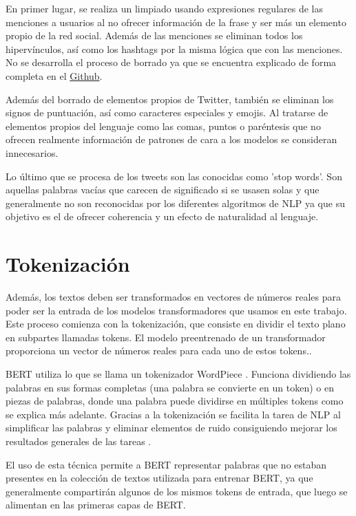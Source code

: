 En primer lugar, se realiza un limpiado usando expresiones regulares de las menciones a usuarios al no ofrecer información de la frase y ser más un elemento propio de la red social. Además de las menciones se eliminan todos los hipervínculos, así como los hashtags por la misma lógica que con las menciones. No se desarrolla el proceso de borrado ya que se encuentra explicado de forma completa en el \href{https://github.com/ValenUC3M/-NLP-BachelorThesis-GonzaloValenti}{Github}.

Además del borrado de elementos propios de Twitter, también se eliminan los signos de puntuación, así como caracteres especiales y emojis. Al tratarse de elementos propios del lenguaje como las comas, puntos o paréntesis que no ofrecen realmente información de patrones de cara a los modelos se consideran innecesarios.

Lo último que se procesa de los tweets son las conocidas como 'stop words'. Son aquellas palabras vacías que carecen de significado si se usasen solas y que generalmente no son reconocidas por los diferentes algoritmos de NLP \cite{silva2003importance} ya que su objetivo es el de ofrecer coherencia y un efecto de naturalidad al lenguaje.


\section{Tokenización} \label{tokenización}

Además, los textos deben ser transformados en vectores de números reales para poder ser la entrada de los modelos transformadores que usamos en este trabajo. Este proceso comienza con la tokenización, que consiste en dividir el texto plano en subpartes llamadas tokens. El modelo preentrenado de un transformador proporciona un vector de números reales para cada uno de estos tokens.\cite{venkatesan2022implications}.

BERT utiliza lo que se llama un tokenizador WordPiece \cite{wordpiece}. Funciona dividiendo las palabras en sus formas completas (una palabra se convierte en un token) o en piezas de palabras, donde una palabra puede dividirse en múltiples tokens como se explica más adelante. Gracias a la tokenización se facilita la tarea de NLP al simplificar las palabras y eliminar elementos de ruido consiguiendo mejorar los resultados generales de las tareas \cite{webster1992tokenization}.

El uso de esta técnica permite a BERT representar palabras que no estaban presentes en la colección de textos utilizada para entrenar BERT, ya que generalmente compartirán algunos de los mismos tokens de entrada, que luego se alimentan en las primeras capas de BERT.

